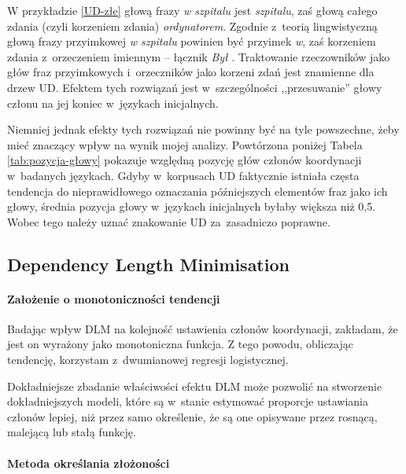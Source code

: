W przykładzie \eqref{UD-złe} głową frazy \textit{w szpitalu} jest \textit{szpitalu}, zaś głową całego zdania (czyli korzeniem zdania) \textit{ordynatorem}. Zgodnie z~teorią lingwistyczną głową frazy przyimkowej \textit{w szpitalu} powinien być przyimek \textit{w}, zaś korzeniem zdania z~orzeczeniem imiennym -- łącznik \textit{Był} \citep{hoeksema1992head}. Traktowanie rzeczowników jako głów fraz przyimkowych i~orzeczników jako korzeni zdań jest znamienne dla drzew UD. Efektem tych rozwiązań jest w~szczególności ,,przesuwanie'' głowy członu na jej koniec w~językach inicjalnych.

Niemniej jednak efekty tych rozwiązań nie powinny być na tyle powszechne, żeby mieć znaczący wpływ na wynik mojej analizy. Powtórzona poniżej Tabela \ref{tab:pozycja-głowy} pokazuje względną pozycję głów członów koordynacji w~badanych językach. Gdyby w~korpusach UD faktycznie istniała częsta tendencja do nieprawidłowego oznaczania późniejszych elementów fraz jako ich głowy, średnia pozycja głowy w~językach inicjalnych byłaby większa niż 0,5. Wobec tego należy uznać znakowanie UD za~zasadniczo poprawne.



\subsection{Dependency Length Minimisation}

\paragraph{Założenie o monotoniczności tendencji}

Badając wpływ DLM na kolejność ustawienia członów koordynacji, zakładam, że jest on wyrażony jako monotoniczna funkcja. Z tego powodu, obliczając tendencję, korzystam z~dwumianowej regresji logistycznej.


Dokładniejsze zbadanie właściwości efektu DLM może pozwolić na stworzenie dokładniejszych modeli, które są w~stanie estymować proporcje ustawiania członów lepiej, niż przez samo określenie, że są one opisywane przez rosnącą, malejącą lub stałą funkcję. 

\paragraph{Metoda określania złożoności}

